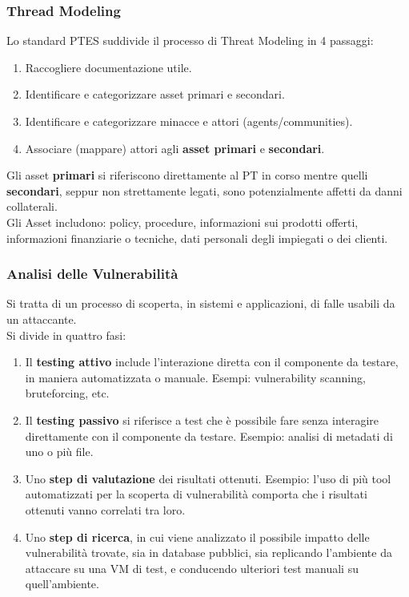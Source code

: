 \documentclass{article}
\begin{document}
\subsubsection{Thread Modeling}
Lo standard PTES suddivide il processo di Threat Modeling in 4 passaggi:
\begin{enumerate}
    \item Raccogliere documentazione utile.
    \item Identificare e categorizzare asset primari e secondari.
    \item Identificare e categorizzare minacce e attori (agents/communities).
    \item Associare (mappare) attori agli \textbf{asset primari} e \textbf{secondari}.
\end{enumerate}

Gli asset \textbf{primari} si riferiscono direttamente al PT in corso mentre quelli \textbf{secondari}, seppur non strettamente legati, sono potenzialmente affetti da danni collaterali.\\
Gli Asset includono: policy, procedure, informazioni sui prodotti offerti, informazioni finanziarie o tecniche, dati personali degli impiegati o dei clienti. 

\subsubsection{Analisi delle Vulnerabilità}
Si tratta di un processo di scoperta, in sistemi e applicazioni, di falle usabili da un attaccante.\\ Si divide in quattro fasi:
\begin{enumerate}
    \item Il \textbf{testing attivo} include l'interazione diretta con il componente da testare, in maniera automatizzata o manuale. Esempi: vulnerability scanning, bruteforcing, etc.

    \item Il \textbf{testing passivo} si riferisce a test che è possibile fare senza interagire direttamente con il componente da testare. Esempio: analisi di metadati di uno o più file.

    \item Uno \textbf{step di valutazione} dei risultati ottenuti. Esempio: l'uso di più tool automatizzati per la scoperta di vulnerabilità comporta che i risultati ottenuti vanno correlati tra loro.

    \item Uno \textbf{step di ricerca}, in cui viene analizzato il possibile impatto delle vulnerabilità trovate, sia in database pubblici, sia replicando l’ambiente da attaccare su una VM di test, e conducendo ulteriori test manuali su quell’ambiente.    
\end{enumerate}
\newpage
\end{document}

